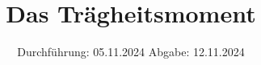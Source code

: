 

\subject{V101}
\title{Das Trägheitsmoment}
\date{%
  Durchführung: 05.11.2024
  \hspace{3em}
  Abgabe: 12.11.2024
}



\maketitle
\thispagestyle{empty}
\tableofcontents
\newpage








\printbibliography{}


